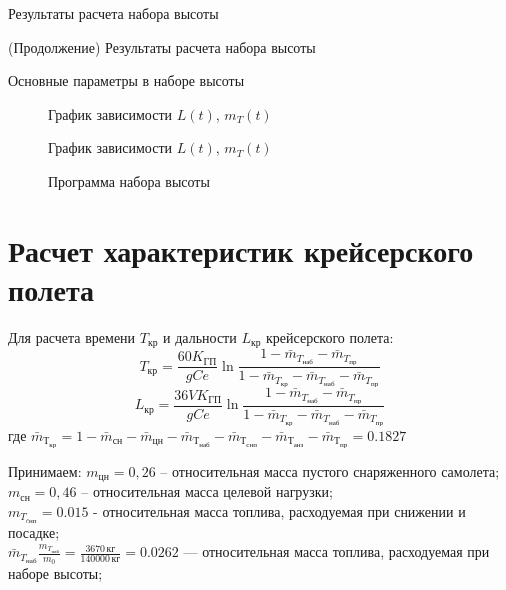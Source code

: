 \begin{sidewaystable}
    \centering
    \caption{Результаты расчета набора высоты}
    \label{tab:result_climb}
    
    \centering
    \addtocounter{table}{-1}
    \addtocounter{totaltables}{-1}
    \caption{(Продолжение) Результаты расчета набора высоты}
    
    \caption{Основные параметры в наборе высоты}
    
    \label{tab:minitable_climb}
\end{sidewaystable}

\begin{figure}[H]
\centering
\resizebox{.79\linewidth}{!}{}
\caption{График зависимости $L(t)$, $m_{T}(t)$}
\label{fig:climb_params}
\end{figure}

\begin{figure}[H]
\centering
\resizebox{.79\linewidth}{!}{}
\caption{График зависимости $L(t)$, $m_{T}(t)$}
\label{fig:L_t_climb}
\end{figure}
 
\begin{figure}[H]
\centering
\resizebox{.79\linewidth}{!}{}
\caption{Программа набора высоты}
\label{fig:H_M_des}
\end{figure}

\section{Расчет характеристик крейсерского полета}\label{sec:level_fl}

Для расчета времени $T_{кр}$ и дальности $L_{кр}$ крейсерского полета:
\begin{equation}
T_{кр} = \frac{60 K_{ГП}}{gCe} \ln{\frac{1 - \bar{m}_{T_{наб}} - \bar{m}_{T_{пр}}}{1 - \bar{m}_{T_{кр}}-\bar{m}_{T_{наб}}-\bar{m}_{T_{пр}}}}
\end{equation}
\begin{equation}
L_{кр} = \frac{36 V K_{ГП}}{gCe} \ln{\frac{1 - \bar{m}_{T_{наб}} - \bar{m}_{T_{пр}}}{1 - \bar{m}_{T_{кр}}-\bar{m}_{T_{наб}}-\bar{m}_{T_{пр}}}}
\end{equation}
где $\bar{m}_{Т_{кр}} = 1 - \bar{m}_{сн} - \bar{m}_{цн} - \bar{m}_{Т_{наб}} -
\bar{m}_{Т_{снп}} - \bar{m}_{Т_{анз}} - \bar{m}_{Т_{пр}} = 0.1827$ 

Принимаем:
$m_{цн} = 0,26$ – относительная масса пустого снаряженного самолета;\\
$m_{сн} =0,46$ – относительная масса целевой нагрузки;\\
$m_{T_{cнп}} =0.015$ - относительная масса топлива, расходуемая при снижении и
посадке;\\
$\bar{m}_{T_{наб}} \frac{m_{T_{наб}}}{m_0} = \frac{3670\, \text{кг}}{140000\, \text{кг}} = 0.0262$ ---
относительная масса топлива, расходуемая при наборе высоты;


